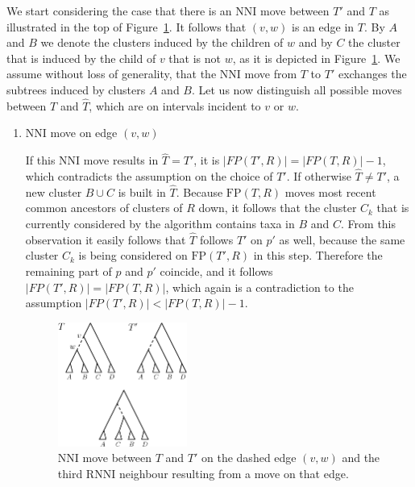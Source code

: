 \documentclass{amsart}
\newcommand{\rnni}{\mathrm{RNNI}}
\newcommand{\nni}{\mathrm{NNI}}
\newcommand{\fp}{\mathrm{FP}}
\begin{document}
We start considering the case that there is an $\nni$ move between $T'$ and $T$ as illustrated in the top of Figure~\ref{fig:thm_fp_nni1}.
It follows that $(v,w)$ is an edge in $T$.
By $A$ and $B$ we denote the clusters induced by the children of $w$ and by $C$ the cluster that is induced by the child of $v$ that is not $w$, as it is depicted in Figure~\ref{fig:thm_fp_nni1}.
We assume without loss of generality, that the $\nni$ move from $T$ to $T'$ exchanges the subtrees induced by clusters $A$ and $B$.
Let us now distinguish all possible moves between $T$ and $\hat T$, which are on intervals incident to $v$ or $w$.

\begin{enumerate}
    \item $\nni$ move on edge $(v,w)$

    If this $\nni$ move results in $\hat T = T'$, it is $|FP(T',R)| = |FP(T,R)| - 1$, which contradicts the assumption on the choice of $T'$.
    If otherwise $\hat T \neq T'$, a new cluster $B \cup C$ is built in $\hat T$.
    Because $\fp(T,R)$ moves most recent common ancestors of clusters of $R$ down, it follows that the cluster $C_k$ that is currently considered by the algorithm contains taxa in $B$ and $C$.
    From this observation it easily follows that $\hat T$ follows $T'$ on $p'$ as well, because the same cluster $C_k$ is being considered on $\fp(T',R)$ in this step.
    Therefore the remaining part of $p$ and $p'$ coincide, and it follows $|FP(T',R)| = |FP(T,R)|$, which again is a contradiction to the assumption $|FP(T',R)| < |FP(T,R)| - 1$.

    \begin{figure}[!hbt]
    \centering
    \includegraphics[width=0.4\textwidth]{thm_fp_nni1}
    \vspace{12pt}
    \caption{$\nni$ move between $T$ and $T'$ on the dashed edge $(v,w)$ and the third $\rnni$ neighbour resulting from a move on that edge.}
    \label{fig:thm_fp_nni1}
    \end{figure}


\end{enumerate}
\end{document}
